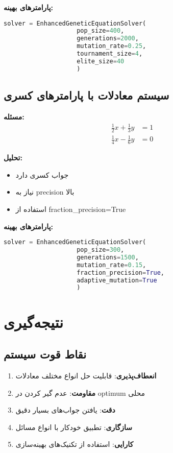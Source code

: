 \documentclass[12pt,a4paper]{article}
\newenvironment{ltrcode}{\lr\bgroup}{\egroup}
\begin{document}
			\textbf{پارامترهای بهینه:}
			\begin{ltrcode}
				\begin{lstlisting}[language=Python]
					solver = EnhancedGeneticEquationSolver(
					pop_size=400,
					generations=2000,
					mutation_rate=0.25,
					tournament_size=4,
					elite_size=40
					)
				\end{lstlisting}
			\end{ltrcode}
			
			\subsection{سیستم معادلات با پارامترهای کسری}
			
			\textbf{مسئله:}
			\begin{align}
				\frac{1}{2}x + \frac{1}{3}y &= 1 \\
				\frac{1}{4}x - \frac{1}{6}y &= 0
			\end{align}
			
			\textbf{تحلیل:}
			\begin{itemize}
				\item جواب کسری دارد
				\item نیاز به precision بالا
				\item استفاده از fraction\_precision=True
			\end{itemize}
			
			\textbf{پارامترهای بهینه:}
			\begin{ltrcode}
				\begin{lstlisting}[language=Python]
					solver = EnhancedGeneticEquationSolver(
					pop_size=300,
					generations=1500,
					mutation_rate=0.15,
					fraction_precision=True,
					adaptive_mutation=True
					)
				\end{lstlisting}
			\end{ltrcode}
			
			\section{نتیجه‌گیری}
			
			\subsection{نقاط قوت سیستم}
			
			\begin{enumerate}
				\item \textbf{انعطاف‌پذیری}: قابلیت حل انواع مختلف معادلات
				\item \textbf{مقاومت}: عدم گیر کردن در optimum محلی
				\item \textbf{دقت}: یافتن جواب‌های بسیار دقیق
				\item \textbf{سازگاری}: تطبیق خودکار با انواع مسائل
				\item \textbf{کارایی}: استفاده از تکنیک‌های بهینه‌سازی
			\end{enumerate}
			
\end{document}
